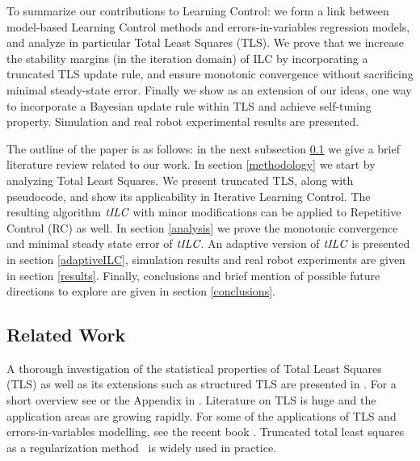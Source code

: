 To summarize our contributions to Learning Control: we form a link between model-based Learning Control methods and errors-in-variables regression models, and analyze in particular Total Least Squares (TLS). We prove that we increase the stability margins (in the iteration domain) of ILC by incorporating a truncated TLS update rule, and ensure monotonic convergence without sacrificing minimal steady-state error. 
Finally we show as an extension of our ideas, one way to incorporate a Bayesian update rule within TLS and achieve self-tuning property. Simulation and real robot experimental results are presented.

The outline of the paper is as follows: in the next subsection \ref{relatedWork} we give a brief literature review related to our work. In section \ref{methodology} we start by analyzing Total Least Squares. We present truncated TLS, along with pseudocode, and show its applicability in Iterative Learning Control. The resulting algorithm $\emph{tILC}$ with minor modifications can be applied to Repetitive Control (RC) as well. In section \ref{analysis} we prove the monotonic convergence and minimal steady state error of $\emph{tILC}$. An adaptive version of $\emph{tILC}$ is presented in section \ref{adaptiveILC}, simulation results and real robot experiments are given in section \ref{results}. Finally, conclusions and brief mention of possible future directions to explore are given in section \ref{conclusions}.

\subsection{Related Work}\label{relatedWork}

A thorough investigation of the statistical properties of Total Least Squares (TLS) as well as its extensions such as structured TLS are presented in \cite{VanHuffel91}. For a short overview see \cite{Golub80} or the Appendix in \cite{Golub96}. Literature on TLS is huge and the application areas are growing rapidly. For some of the applications of TLS and errors-in-variables modelling, see the recent book \cite{VanHuffel13}. Truncated total least squares as a regularization method~\cite{Fierro97} is widely used in practice. %

